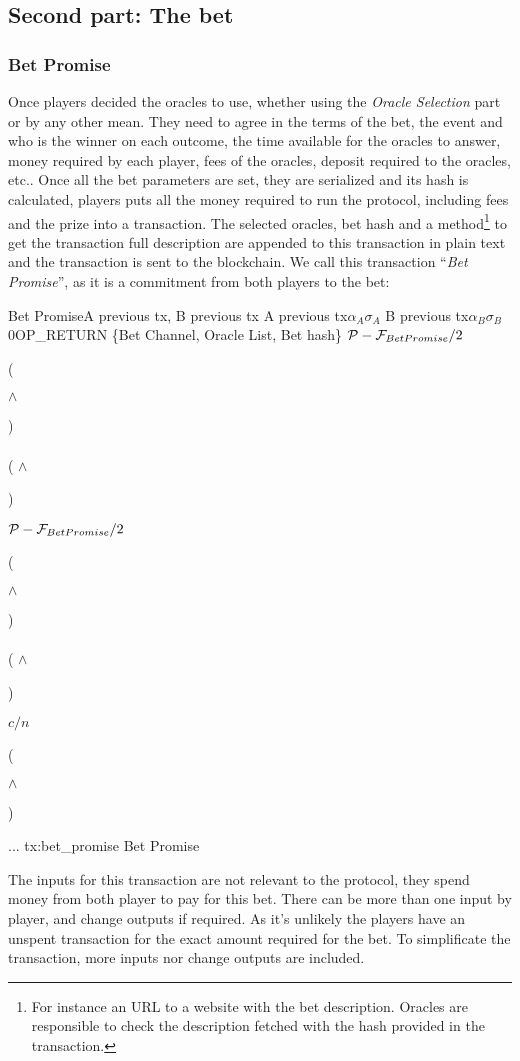 \subsection{Second part: The bet}

\subsubsection{Bet Promise}
Once players decided the oracles to use, whether using the \textit{Oracle
  Selection} part or by any other mean.
They need to agree in the terms of the bet, the event and who is the winner on
  each outcome, the time available for the oracles to answer, money required by
  each player, fees of the  oracles, deposit required to the oracles, etc..
Once all the bet parameters are set, they are serialized and its hash is
  calculated, players puts all the money required to run the protocol,
  including fees and the prize into a transaction.
The selected oracles, bet hash and a method\footnote{For instance an URL to a
  website with the bet description. Oracles are responsible to check the
  description fetched with the hash provided in the transaction.} to get the
  transaction full description are appended to this transaction in plain text
  and the transaction is sent to the blockchain.
We call this transaction ``\textit{Bet Promise}'', as it is a commitment from both
  players to the bet:

\transaction
    {Bet Promise}{A previous tx, B previous tx}
    {A previous tx}{$\alpha_A$}{$\sigma_A$}
    {B previous tx}{$\alpha_B$}{$\sigma_B$}
    \stopinputs
    {0}{\footnotesize{OP\_RETURN \{Bet Channel, Oracle List, Bet hash\}}}
    {$\mathcal{P} - \mathcal{F}_{Bet Promise} / 2$}{(\signature{A} $\wedge$ \signature{B}) \\
                                                   \vee \\
                                                  ( $\wedge$ \signature{A}) }
    {$\mathcal{P} - \mathcal{F}_{Bet Promise} / 2$}{(\signature{A} $\wedge$ \signature{B}) \\
                                                   \vee \\
                                                  ( $\wedge$ \signature{B}) }
    {$c/n$}{(\signature{A} $\wedge$ \signature{B})}
    {...}{}
    \stopoutputs
    {tx:bet_promise}
    {Bet Promise}

The inputs for this transaction are not relevant to the protocol, they spend
  money from both player to pay for this bet.
There can be more than one input by player, and change outputs if required.
As it's unlikely the players have an unspent transaction for the exact amount
  required for the bet.
To simplificate the transaction, more inputs nor change outputs are included.

